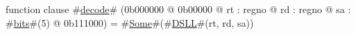 function clause #\hyperref[zdecode]{decode}# (0b000000 @ 0b00000 @ rt : regno @ rd : regno @ sa : #\hyperref[zbits]{bits}#(5) @ 0b111000) =
  #\hyperref[zSome]{Some}#(#\hyperref[zDSLL]{DSLL}#(rt, rd, sa))
